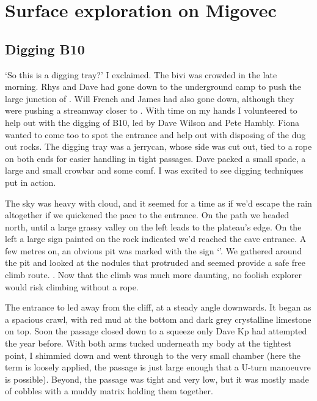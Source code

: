     
\section{Surface exploration on Migovec}
\subsection{Digging B10}
`So this is a digging tray?' I exclaimed. The bivi was crowded in the late morning. Rhys and Dave had gone down to the underground camp to push the large junction of . Will French and James had also gone down, although they were pushing a streamway closer to . With time on my hands I volunteered to help out with the digging of B10, led by Dave Wilson and Pete Hambly. Fiona wanted to come too to spot the entrance and help out with disposing of the dug out rocks. The digging tray was a jerrycan, whose side was cut out, tied to a rope on both ends for easier handling in tight passages. Dave packed a small spade, a large and small crowbar and some comf. I was excited to see digging techniques put in action.

The sky was heavy with cloud, and it seemed for a time as if we'd escape the rain altogether if we quickened the pace to the entrance. On the  path we headed north, until a large grassy valley on the left leads to the plateau's edge. On the left a large sign painted on the rock indicated we'd reached the cave entrance. A few metres on, an obvious pit was marked with the sign `'.  We gathered around the pit and looked at the nodules that protruded and seemed provide a safe free climb route. . Now that the climb was much more daunting, no foolish explorer would risk climbing without a rope.

The entrance to  led away from the cliff, at a steady angle downwards. It began as a spacious crawl, with red mud at the bottom and dark grey crystalline limestone on top. Soon the passage closed down to a squeeze only Dave Kp had attempted the year before. With both arms tucked underneath my body at the tightest point, I shimmied down and went through to the very small chamber (here the term is loosely applied, the passage is just large enough that a U-turn manoeuvre is possible). Beyond, the passage was tight and very low, but it was mostly made of cobbles with a muddy matrix holding them together.

